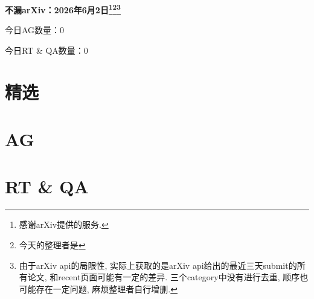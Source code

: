 \documentclass[9pt, a4paper]{article}
\theoremstyle{plain}
\theoremstyle{definition}
\theoremstyle{remark}
\newcommand{\AGnumber}{0}
\newcommand{\RTQAnumber}{0}
\newcommand{\NewestDate}{2026年6月2日}
\newcommand{\todayarXiver}{} %
\begin{document}
\begin{center}
    \Huge\textbf{不漏arXiv：\NewestDate\footnote{感谢arXiv提供的服务.}\footnote{今天的整理者是\todayarXiver}\footnote{由于arXiv api的局限性, 实际上获取的是arXiv api给出的最近三天submit的所有论文, 和recent页面可能有一定的差异. 三个category中没有进行去重, 顺序也可能存在一定问题, 麻烦整理者自行增删.}} \\
\end{center}

\setcounter{section}{-1}

\begin{center}
    今日AG数量：\AGnumber
    
    今日RT \& QA数量：\RTQAnumber
    
\end{center}


\section{精选}


\section{AG}

\section{RT \& QA}
\end{document}
